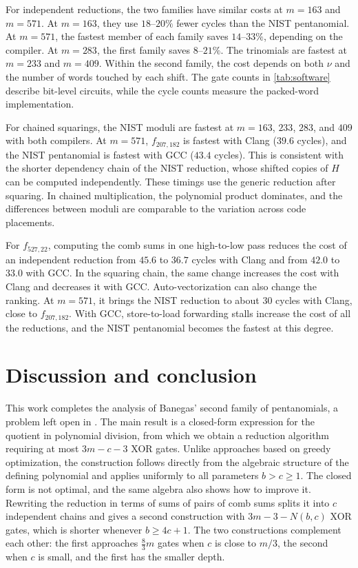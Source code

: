 \documentclass{ieeeaccess}
\theoremstyle{plain}
\theoremstyle{definition}
\begin{document}
For independent reductions, the two families have similar costs at
$m=163$ and $m=571$. At $m=163$, they use $18$--$20\%$ fewer
cycles than the NIST pentanomial. At $m=571$, the fastest member of
each family saves $14$--$33\%$, depending on the compiler. At
$m=283$, the first family saves $8$--$21\%$. The trinomials are
fastest at $m=233$ and $m=409$. Within the second family, the cost
depends on both $\nu$ and the number of words touched by each shift.
The gate counts in \cref{tab:software} describe bit-level circuits,
while the cycle counts measure the packed-word implementation.

For chained squarings, the NIST moduli are fastest at $m=163$,
$233$, $283$, and $409$ with both compilers. At $m=571$,
$f_{207,182}$ is fastest with Clang ($39.6$ cycles), and the NIST
pentanomial is fastest with GCC ($43.4$ cycles). This is consistent
with the shorter dependency chain of the NIST reduction, whose
shifted copies of $H$ can be computed independently. These timings
use the generic reduction after squaring. In chained multiplication,
the polynomial product dominates, and the differences between moduli
are comparable to the variation across code placements.

For $f_{527,22}$, computing the comb sums in one high-to-low pass
reduces the cost of an independent reduction from $45.6$ to $36.7$
cycles with Clang and from $42.0$ to $33.0$ with GCC. In the
squaring chain, the same change increases the cost with Clang and
decreases it with GCC. Auto-vectorization can also change the
ranking. At $m=571$, it brings the NIST reduction to about $30$
cycles with Clang, close to $f_{207,182}$. With GCC, store-to-load
forwarding stalls increase the cost of all the reductions, and the
NIST pentanomial becomes the fastest at this degree.


\section{Discussion and conclusion}\label{sec:conclusion}

This work completes the analysis of Banegas' second family of pentanomials, a
problem left open in \cite{Banegas2015}. The main result is a closed-form
expression for the quotient in polynomial division, from which we obtain a
reduction algorithm requiring at most $3m-c-3$ XOR gates. Unlike approaches
based on greedy optimization, the construction follows directly from the
algebraic structure of the defining polynomial and applies uniformly to all
parameters $b>c\ge1$. The closed form is not optimal, and the same algebra also
shows how to improve it. Rewriting the reduction in terms of sums of pairs of
comb sums splits it into $c$ independent chains and gives a second construction
with $3m-3-N(b,c)$ XOR gates, which is shorter whenever $b\ge4c+1$. The two
constructions complement each other: the first approaches $\tfrac83m$ gates
when $c$ is close to $m/3$, the second when $c$ is small, and the first has the
smaller depth.
\end{document}
